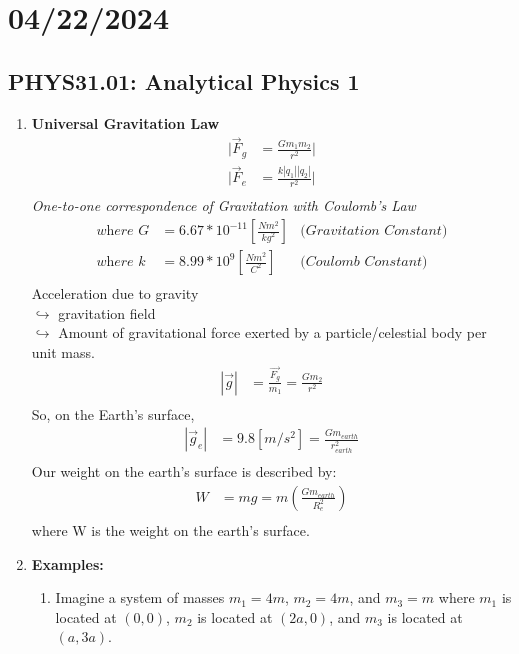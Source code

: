 \documentclass{article}
\begin{document}
\section*{04/22/2024}
\subsection*{PHYS31.01: Analytical Physics 1}
\begin{enumerate}
    \item \textbf{Universal Gravitation Law} \\
    \begin{align*}
        |\vec{F}_g&=\frac{Gm_1m_2}{r^2}| \\
        |\vec{F}_e&=\frac{k|q_1||q_2|}{r^2}| \\
    \end{align*}
        \textit{One-to-one correspondence of Gravitation with Coulomb's Law} \\
    \begin{align*}
        \textit{where }G&=6.67*10^{-11}[\frac{Nm^2}{kg^2}]&\textit{(Gravitation Constant)} \\
        \textit{where }k&=8.99*10^{9}[\frac{Nm^2}{C^2}]&\textit{(Coulomb Constant)} \\
    \end{align*}
    Acceleration due to gravity \\
    $\hookrightarrow$ gravitation field \\
    $\hookrightarrow$ Amount of gravitational force exerted by a particle/celestial body per unit mass.
    \begin{align*}
        |\vec{g}|&=\frac{\vec{F_g}}{m_1}=\frac{Gm_2}{r^2} \\
    \end{align*}
    So, on the Earth's surface,
    \begin{align*}
        |\vec{g}_e|&=9.8[m/s^2]=\frac{Gm_{earth}}{r_{earth}^2} \\
    \end{align*}
    Our weight on the earth's surface is described by:
    \begin{align*}
        W&=mg=m(\frac{Gm_{earth}}{R_e^2}) \\
    \end{align*}
    where W is the weight on the earth's surface.
    \item \textbf{Examples: } \\
    \begin{enumerate}
        \item Imagine a system of masses $m_1=4m$, $m_2=4m$, and $m_3=m$ where $m_1$ is located at $(0,0)$, $m_2$ is located at $(2a,0)$, and $m_3$ is located at $(a,3a)$.

\end{enumerate}
\end{enumerate}
\end{document}
